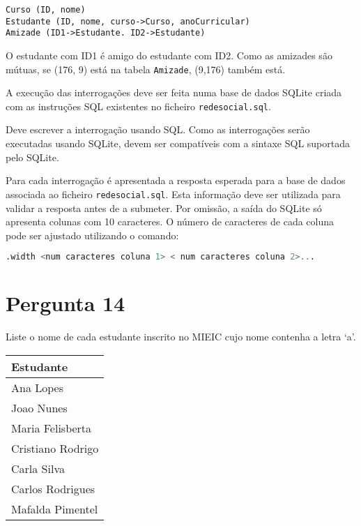 {\begin{lstlisting}[numbers=none]
Curso (ID, nome)
Estudante (ID, nome, curso->Curso, anoCurricular)
Amizade (ID1->Estudante. ID2->Estudante)
\end{lstlisting}

O estudante com ID1 é amigo do estudante com ID2. Como as amizades são mútuas, se (176, 9) está na tabela \texttt{Amizade}, (9,176) também está.

A execução das interrogações deve ser feita numa base de dados SQLite criada com as instruções SQL existentes no ficheiro \texttt{redesocial.sql}.

Deve escrever a interrogação usando SQL. Como as interrogações serão executadas usando SQLite, devem ser compatíveis com a sintaxe SQL suportada pelo SQLite.

Para cada interrogação é apresentada a resposta esperada para a base de dados associada ao ficheiro \texttt{redesocial.sql}. Esta informação deve ser utilizada para validar a resposta antes de a submeter. Por omissão, a saída do SQLite só apresenta colunas com 10 caracteres. O número de caracteres de cada coluna pode ser ajustado utilizando o comando:

\begin{lstlisting}[language=SQL,numbers=none]
.width <num caracteres coluna 1> < num caracteres coluna 2>...
\end{lstlisting}

\section{Pergunta 14}
Liste o nome de cada estudante inscrito no MIEIC cujo nome contenha a letra `a'.
\begin{center} \begin{tabular}{l}
    \textbf{Estudante} \\ \hline
    Ana Lopes          \\
    Joao Nunes         \\
    Maria Felisberta   \\
    Cristiano Rodrigo  \\
    Carla Silva        \\
    Carlos Rodrigues   \\
    Mafalda Pimentel   
\end{tabular} \end{center}


}

